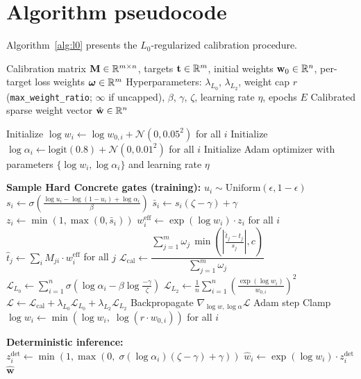 \section{Algorithm pseudocode}
\label{app:algorithm}

Algorithm~\ref{alg:l0} presents the $L_0$-regularized calibration procedure.

\begin{algorithm}[H]
\caption{$L_0$-regularized calibration with Hard Concrete gates}
\label{alg:l0}
\begin{algorithmic}[1]
\Require Calibration matrix $\mathbf{M} \in \mathbb{R}^{m \times n}$, targets $\mathbf{t} \in \mathbb{R}^m$, initial weights $\mathbf{w}_0 \in \mathbb{R}^n$, per-target loss weights $\boldsymbol{\omega} \in \mathbb{R}^m$
\Require Hyperparameters: $\lambda_{L_0}$, $\lambda_{L_2}$, weight cap $r$ (\texttt{max\_weight\_ratio}; $\infty$ if uncapped), $\beta$, $\gamma$, $\zeta$, learning rate $\eta$, epochs $E$
\Ensure Calibrated sparse weight vector $\hat{\mathbf{w}} \in \mathbb{R}^n$

\State Initialize $\log w_i \gets \log w_{0,i} + \mathcal{N}(0, 0.05^2)$ for all $i$
\State Initialize $\log \alpha_i \gets \text{logit}(0.8) + \mathcal{N}(0, 0.01^2)$ for all $i$
\State Initialize Adam optimizer with parameters $\{\log w_i, \log \alpha_i\}$ and learning rate $\eta$

    \State \textbf{Sample Hard Concrete gates (training):}
        \State $u_i \sim \text{Uniform}(\epsilon, 1-\epsilon)$
        \State $s_i \gets \sigma\!\left(\frac{\log u_i - \log(1-u_i) + \log \alpha_i}{\beta}\right)$
        \State $\bar{s}_i \gets s_i(\zeta - \gamma) + \gamma$
        \State $z_i \gets \min(1, \max(0, \bar{s}_i))$
    \EndFor
    \State $w_i^{\text{eff}} \gets \exp(\log w_i) \cdot z_i$ for all $i$
    \State $\hat{t}_j \gets \sum_i M_{ji} \cdot w_i^{\text{eff}}$ for all $j$
    \State $\mathcal{L}_{\text{cal}} \gets \dfrac{\sum_{j=1}^{m}\omega_j\,\min\!\left(\left|\frac{\hat{t}_j - t_j}{s_j}\right|, c\right)}{\sum_{j=1}^{m}\omega_j}$
    \State $\mathcal{L}_{L_0} \gets \sum_{i=1}^{n} \sigma\!\left(\log \alpha_i - \beta \log \frac{-\gamma}{\zeta}\right)$
    \State $\mathcal{L}_{L_2} \gets \frac{1}{n}\sum_{i=1}^{n}\left(\frac{\exp(\log w_i)}{w_{0,i}}\right)^2$ 
    \State $\mathcal{L} \gets \mathcal{L}_{\text{cal}} + \lambda_{L_0} \mathcal{L}_{L_0} + \lambda_{L_2} \mathcal{L}_{L_2}$
    \State Backpropagate $\nabla_{\log w, \log \alpha} \mathcal{L}$
    \State Adam step
    \State Clamp $\log w_i \gets \min\!\left(\log w_i,\; \log(r \cdot w_{0,i})\right)$ for all $i$ 
\EndFor

\State \textbf{Deterministic inference:}
    \State $z_i^{\text{det}} \gets \min\!\left(1, \max\!\left(0,\; \sigma(\log \alpha_i)(\zeta - \gamma) + \gamma\right)\right)$
    \State $\hat{w}_i \gets \exp(\log w_i) \cdot z_i^{\text{det}}$
\EndFor
\State \Return $\hat{\mathbf{w}}$
\end{algorithmic}
\end{algorithm}

